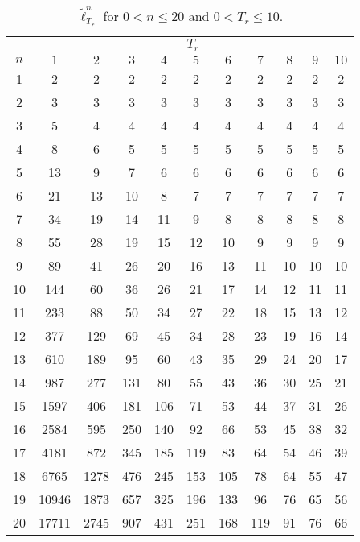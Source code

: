 \documentclass{article}
\begin{document}
    \begin{table}[!ht]
      \centering
      \begin{tabular}{*{11}{c}}
        \toprule
        & \multicolumn{10}{c}{$T_r$} \\
        $n$ & $1$ & $2$ & $3$ & $4$ & $5$ & $6$ & $7$ & $8$ & $9$ & $10$ \\
        \midrule
        1 & 2 & 2 & 2 & 2 & 2 & 2 & 2 & 2 & 2 & 2 \\
        2 & 3 & 3 & 3 & 3 & 3 & 3 & 3 & 3 & 3 & 3 \\
        3 & 5 & 4 & 4 & 4 & 4 & 4 & 4 & 4 & 4 & 4 \\
        4 & 8 & 6 & 5 & 5 & 5 & 5 & 5 & 5 & 5 & 5 \\
        5 & 13 & 9 & 7 & 6 & 6 & 6 & 6 & 6 & 6 & 6 \\
        6 & 21 & 13 & 10 & 8 & 7 & 7 & 7 & 7 & 7 & 7 \\
        7 & 34 & 19 & 14 & 11 & 9 & 8 & 8 & 8 & 8 & 8 \\
        8 & 55 & 28 & 19 & 15 & 12 & 10 & 9 & 9 & 9 & 9 \\
        9 & 89 & 41 & 26 & 20 & 16 & 13 & 11 & 10 & 10 & 10 \\
        10 & 144 & 60 & 36 & 26 & 21 & 17 & 14 & 12 & 11 & 11 \\
        11 & 233 & 88 & 50 & 34 & 27 & 22 & 18 & 15 & 13 & 12 \\
        12 & 377 & 129 & 69 & 45 & 34 & 28 & 23 & 19 & 16 & 14 \\
        13 & 610 & 189 & 95 & 60 & 43 & 35 & 29 & 24 & 20 & 17 \\
        14 & 987 & 277 & 131 & 80 & 55 & 43 & 36 & 30 & 25 & 21 \\
        15 & 1597 & 406 & 181 & 106 & 71 & 53 & 44 & 37 & 31 & 26 \\
        16 & 2584 & 595 & 250 & 140 & 92 & 66 & 53 & 45 & 38 & 32 \\
        17 & 4181 & 872 & 345 & 185 & 119 & 83 & 64 & 54 & 46 & 39 \\
        18 & 6765 & 1278 & 476 & 245 & 153 & 105 & 78 & 64 & 55 & 47 \\
        19 & 10946 & 1873 & 657 & 325 & 196 & 133 & 96 & 76 & 65 & 56 \\
        20 & 17711 & 2745 & 907 & 431 & 251 & 168 & 119 & 91 & 76 & 66 \\
        \bottomrule
      \end{tabular}
      \caption{$\tilde{\ell}_{T_r}^{n}$ for $0 < n \leq 20$ and $0 < T_r \leq 10$.}
      \label{tab:tlnTr}
    \end{table}
\end{document}
